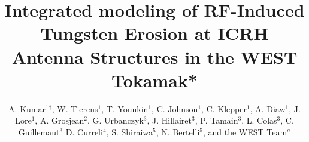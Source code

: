 \documentclass[10pt]{iopart}
\begin{document}
\setlength{\headwidth}{\textwidth}
\pagestyle{fancyplain}
\setlength{\headwidth}{\textwidth}
\addtolength{\headwidth}{\marginparsep}
\addtolength{\headwidth}{\marginparwidth}





\title[]{Integrated modeling of RF-Induced Tungsten Erosion at ICRH Antenna Structures in the WEST Tokamak\mbox{*}}

\author{A. Kumar$^{1}$$^\dagger$, W. Tierens$^1$, T. Younkin$^1$, C. Johnson$^1$, C. Klepper$^1$, A. Diaw$^1$, J. Lore$^1$,  A. Grosjean$^2$, G. Urbanczyk$^3$, J. Hillairet$^3$,  P. Tamain$^3$, L. Colas$^3$, C. Guillemaut$^3$   D. Curreli$^4$, S. Shiraiwa$^5$, N. Bertelli$^5$, and the WEST Team$^a$  }


\address{$^1$Oak Ridge National Laboratory, 1 Bethel Valley Road, Oak Ridge, TN-37831, USA}
\address{$^2$University of Tennessee, Knoxville, TN 37996, USA }
\address{$^3$CEA, IRFM, F-13108 Saint-Paul-lez-Durance, France }
\address{$^4$University of Illinois at Urbana Champaign, Urbana, IL 61801, USA }
\address{$^5$Princeton Plasma Physics Laboratory, Princeton, NJ 08536, USA }
\address{$^a$see http://west.cea.fr/WESTteam }


\end{document}

